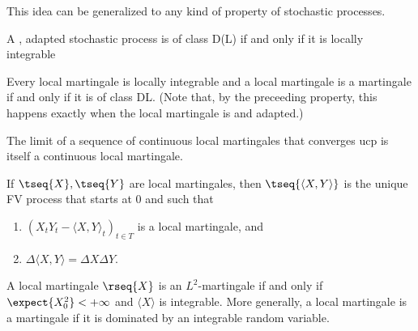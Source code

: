     This idea can be generalized to any kind of property of stochastic processes.

    \begin{property}
        A \cdlgg, adapted stochastic process is of class D(L) if and only if it is locally integrable
    \end{property}
    \begin{property}
        Every local martingale is locally integrable and a local martingale is a martingale if and only if it is of class DL. (Note that, by the preceeding property, this happens exactly when the local martingale is \cdlg and adapted.)
    \end{property}

    \begin{property}[Convergence]
        The limit of a sequence of continuous local martingales that converges ucp is itself a  continuous local martingale.
    \end{property}

    \begin{property}[Covariation]
        If $\tseq{X},\tseq{Y}$ are local martingales, then $\tseq{\langle X,Y \rangle}$ is the unique FV process that starts at 0 and such that
        \begin{enumerate}
            \item $(X_tY_t - \langle X,Y \rangle_t)_{t\in T}$ is a local martingale, and
            \item $\Delta\langle X,Y\rangle = \Delta X\Delta Y$.
        \end{enumerate}
    \end{property}

    \begin{property}
        A local martingale $\rseq{X}$ is an $L^2$-martingale if and only if $\expect{X_0^2}<+\infty$ and $\langle X \rangle$ is integrable. More generally, a local martingale is a martingale if it is dominated by an integrable random variable.
    \end{property}

